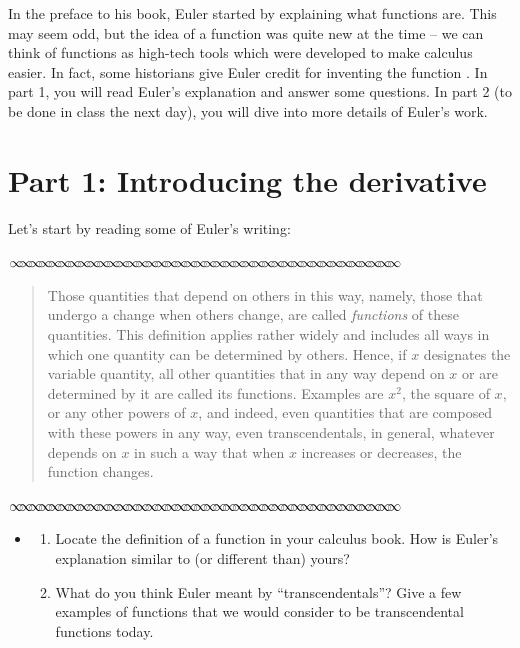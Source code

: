 \documentclass[11pt]{article}
\newcommand{\sep}{\vspace{-3pt}
\begin{center}
{\mathversion{normal}
$\infty \mspace{-5.5mu}\infty \mspace{-5.5mu}\infty \mspace{-5.5mu}\infty \mspace{-5.5mu}
\infty \mspace{-5.5mu}\infty \mspace{-5.5mu}\infty \mspace{-5.5mu}\infty \mspace{-5.5mu}
\infty \mspace{-5.5mu}\infty \mspace{-5.5mu}\infty \mspace{-5.5mu}\infty \mspace{-5.5mu}
\infty \mspace{-5.5mu}\infty \mspace{-5.5mu}\infty \mspace{-5.5mu}\infty \mspace{-5.5mu}
\infty \mspace{-5.5mu}\infty \mspace{-5.5mu}\infty \mspace{-5.5mu}\infty \mspace{-5.5mu}
\infty \mspace{-5.5mu}\infty \mspace{-5.5mu}\infty \mspace{-5.5mu}\infty \mspace{-5.5mu}
\infty \mspace{-5.5mu}\infty \mspace{-5.5mu}\infty \mspace{-5.5mu}\infty \mspace{-5.5mu}
\infty \mspace{-5.5mu}\infty \mspace{-5.5mu}\infty \mspace{-5.5mu}\infty \mspace{-5.5mu}
\infty \mspace{-5.5mu}\infty \mspace{-5.5mu}\infty \mspace{-5.5mu}\infty \mspace{-5.5mu}
\infty \mspace{-5.5mu}\infty \mspace{-5.5mu}\infty \mspace{-5.5mu}\infty \mspace{-5.5mu}$}
\end{center} \vspace*{-5pt}}
\newenvironment{source}%
 {\bigskip \sep \vspace*{-6pt} \begin{quote}
          \begin{sf}   }
   {   \end{sf}     \end{quote} \vspace*{-6pt} \sep \bigskip}%
\newcounter{tasknumb}
\newcommand{\tasknumb}{\stepcounter{tasknumb}\textmd{\textbf{$\fbox{$\fbox{Task \thetasknumb}$}$}}}
\newenvironment{task}%
 {\begin{itemize}
 \item[\tasknumb]  }
{
    \end{itemize}    }%
\begin{document}
In the preface to his book, Euler started by explaining what functions are.  This may seem odd, but the idea of a function was quite new at the time -- we can think of functions as high-tech tools which were developed to make calculus easier.  In fact, some historians give Euler credit for inventing the function \citep{Edwards}.  In part 1, you will read Euler's explanation and answer some questions.  In part 2 (to be done in class the next day), you will dive into more details of Euler's work.



\section*{Part 1: Introducing the derivative}

Let's start by reading some of Euler's writing:



\begin{source}
\vspace*{-6pt}

Those quantities that depend on others in this way, namely, those that undergo a change when others change, are called \emph{functions} of these quantities.  This definition applies rather widely and includes all ways in which one quantity can be determined by others.  Hence, if $x$ designates the variable quantity, all other quantities that in any way depend on $x$ or are determined by it are called its functions.  Examples are $x^2$, the square of $x$, or any other powers of $x$, and indeed, even quantities that are composed with these powers in any way, even transcendentals, in general, whatever depends on $x$ in such a way that when $x$ increases or decreases, the function changes.
\vspace*{-8pt}

\end{source}




\begin{task}
\begin{enumerate}
\item[(a)]  Locate  the definition of a function in your calculus book.  How is Euler's explanation similar to (or different than) yours?
\item[(b)] What do you think Euler meant by ``transcendentals''?  Give a few examples of functions that we would consider to be transcendental functions today.
\end{enumerate}
\end{task}
\end{document}
